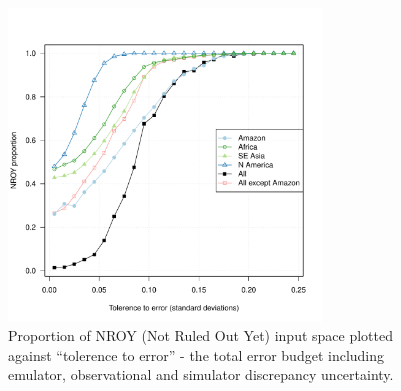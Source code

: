 \documentclass[esd, article]{copernicus} %
\begin{document}
\begin{figure}[t]
\includegraphics[width=8.3cm]{graphics/Prop_NROY_tolerance_unc.pdf}
\caption{Proportion of NROY (Not Ruled Out Yet) input space plotted against ``tolerence to error'' - the total error budget including emulator, observational and simulator discrepancy uncertainty.}
\label{fig:Prop_NROY_tolerance_unc}
\end{figure}

\end{document}
